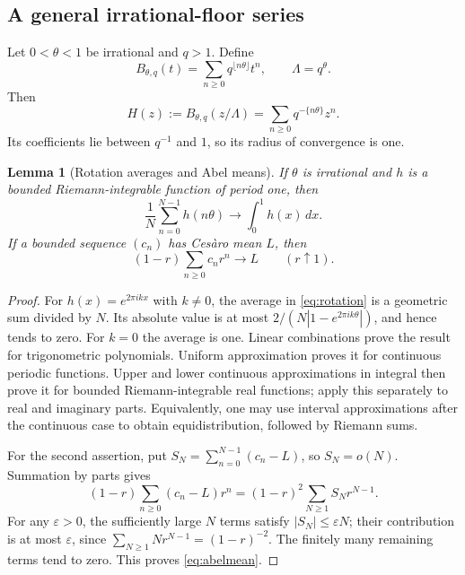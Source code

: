 \documentclass[11pt,letterpaper]{article}
\numberwithin{equation}{section}
\newtheorem{lemma}[lemma]{Lemma}
\theoremstyle{definition}
\theoremstyle{remark}
\begin{document}
\subsection{A general irrational-floor series}
Let $0<\theta<1$ be irrational and $q>1$. Define
\begin{equation}\label{eq:Btheta}
 B_{\theta,q}(t)=\sum_{n\ge0}q^{\lfloor n\theta\rfloor}t^n,
 \qquad \Lambda=q^\theta.
\end{equation}
Then
\[
 H(z):=B_{\theta,q}(z/\Lambda)
 =\sum_{n\ge0}q^{-\{n\theta\}}z^n.
\]
Its coefficients lie between $q^{-1}$ and $1$, so its radius of convergence is one.

\begin{lemma}[Rotation averages and Abel means]\label{lem:abel}
If $\theta$ is irrational and $h$ is a bounded Riemann-integrable function of period one, then
\begin{equation}\label{eq:rotation}
 \frac1N\sum_{n=0}^{N-1}h(n\theta)\longrightarrow\int_0^1h(x)\,dx.
\end{equation}
If a bounded sequence $(c_n)$ has Ces\`aro mean $L$, then
\begin{equation}\label{eq:abelmean}
 (1-r)\sum_{n\ge0}c_n r^n\longrightarrow L\qquad(r\uparrow1).
\end{equation}
\end{lemma}
\begin{proof}
For $h(x)=e^{2\pi i kx}$ with $k\ne0$, the average in \eqref{eq:rotation} is a geometric sum divided by $N$. Its absolute value is at most $2/(N|1-e^{2\pi i k\theta}|)$, and hence tends to zero. For $k=0$ the average is one. Linear combinations prove the result for trigonometric polynomials. Uniform approximation proves it for continuous periodic functions. Upper and lower continuous approximations in integral then prove it for bounded Riemann-integrable real functions; apply this separately to real and imaginary parts. Equivalently, one may use interval approximations after the continuous case to obtain equidistribution, followed by Riemann sums.

For the second assertion, put $S_N=\sum_{n=0}^{N-1}(c_n-L)$, so $S_N=o(N)$. Summation by parts gives
\[
 (1-r)\sum_{n\ge0}(c_n-L)r^n
 =(1-r)^2\sum_{N\ge1}S_Nr^{N-1}.
\]
For any $\varepsilon>0$, the sufficiently large $N$ terms satisfy $|S_N|\le\varepsilon N$; their contribution is at most $\varepsilon$, since $\sum_{N\ge1}Nr^{N-1}=(1-r)^{-2}$. The finitely many remaining terms tend to zero. This proves \eqref{eq:abelmean}.
\end{proof}
\end{document}
